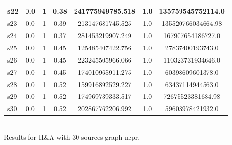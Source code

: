 \documentclass{article}
\begin{document}
\begin{tabular}{|l|c|c|c|c|c|c|}
\hline
s22 &0.0 & 1 & 0.38 & 241775949785.518 & 1.0 & 135759545752114.0\\
\hline
s23 &0.0 & 1 & 0.39 & 213147681745.525 & 1.0 & 135520766034664.98\\
\hline
s24 &0.0 & 1 & 0.37 & 281453219907.249 & 1.0 & 167907654186727.0\\
\hline
s25 &0.0 & 1 & 0.45 & 125485407422.756 & 1.0 & 27837400193743.0\\
\hline
s26 &0.0 & 1 & 0.45 & 223245505966.066 & 1.0 & 110323731934646.0\\
\hline
s27 &0.0 & 1 & 0.45 & 174010965911.275 & 1.0 & 60398609601378.0\\
\hline
s28 &0.0 & 1 & 0.52 & 159916892529.227 & 1.0 & 63437114944563.0\\
\hline
s29 &0.0 & 1 & 0.52 & 174969739333.517 & 1.0 & 72675523381684.98\\
\hline
s30 &0.0 & 1 & 0.52 & 202867762206.992 & 1.0 & 59603978421932.0\\
\hline
\end{tabular}\\

\noindent Results for H\&A with 30 sources graph ncpr.
\end{document}
